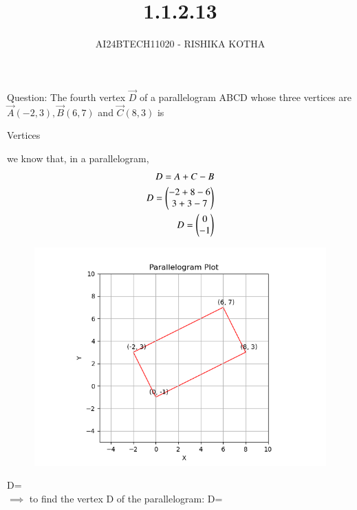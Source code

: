 \documentclass[journal]{IEEEtran}
\begin{document}

\vspace{3cm}

\title{1.1.2.13}
\author{AI24BTECH11020 - RISHIKA KOTHA}
{\let\newpage\relax\maketitle}

\renewcommand{\thefigure}{\theenumi}
\renewcommand{\thetable}{\theenumi}
\setlength{\intextsep}{10pt} %


\renewcommand{\thetable}{\theenumi}

Question:
The fourth vertex $\vec{D}$ of a parallelogram ABCD whose three vertices are $\vec{A}(-2, 3),\vec{B}(6, 7)$ and $\vec{C}(8, 3)$ is
\\
\solution
\begin{table}[h!]    
  \centering
  
  \caption{Vertices}
  \label{tab1.2.13.1}
\end{table}
 
we know that, in a parallelogram,
\begin{align}
	D=A+C-B\\
        D=\begin{pmatrix}-2+8-6\\3+3-7\end{pmatrix}\\
	D=\begin{pmatrix}0\\-1\end{pmatrix}\\
\end{align}
\begin{figure}[h!]
   \centering
   \includegraphics[width=0.7\linewidth]{fig/Figure_1.png}
   \label{parallelogram graph}
\end{figure}
D=\\
$\implies$ to find the vertex D of the parallelogram: 
        D=
\end{document}
